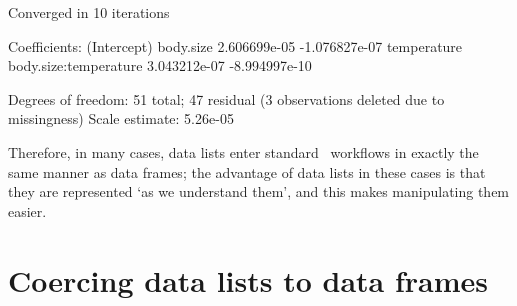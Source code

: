 \documentclass[a4paper]{report}
\numberwithin{exercise}{section}
\begin{document}
\begin{article}
\begin{Schunk}
\begin{Soutput}
Converged in 10 iterations

Coefficients:
          (Intercept)             body.size 
         2.606699e-05         -1.076827e-07 
          temperature body.size:temperature 
         3.043212e-07         -8.994997e-10 

Degrees of freedom: 51 total; 47 residual
  (3 observations deleted due to missingness)
Scale estimate: 5.26e-05 
\end{Soutput}
\end{Schunk}
Therefore, in many cases, data lists enter standard \R\ workflows in exactly the same manner as data frames; the advantage of data lists in these cases is that they are represented `as we understand them', and this makes manipulating them easier.

\section{Coercing data lists to data frames}



\end{article}
\end{document}
